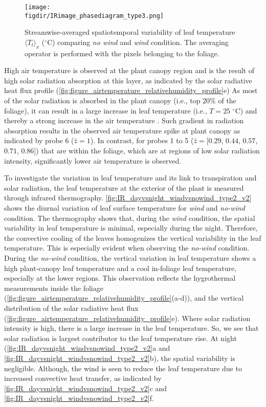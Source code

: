 \begin{sidewaysfigure}[p]
	\centering
	\texttt{[image: \\figdir/IRimage\_phasediagram\_type3.png]}
	\caption{Streamwise-averaged spatiotemporal variability of leaf temperature $\langle T_l \rangle_x$ ($^{\circ}$C) comparing  \textit{no wind} and  \textit{wind} condition. The averaging operator is performed with the pixels belonging to the foliage.}
	\label{fig:IRimage_phasediagram_type3}
\end{sidewaysfigure}

High air temperature is observed at the plant canopy region and is the result of high solar radiation absorption at this layer, as indicated by the solar radiative heat flux profile (\cref{fig:figure_airtemperature_relativehumidity_profile}e) As most of the solar radiation is absorbed in the plant canopy (i.e., top $20\%$ of the foliage), it can result in a large increase in leaf temperature (i.e., $T=25$ $^{\circ}$C) and thereby a strong increase in the air temperature \citep{Manickathan2018a}. Such gradient in radiation absorption results in the observed air temperature spike at plant canopy as indicated by probe 6 ($\hat{z}=1$). In contrast, for probes 1 to 5 ($\hat{z}=[0.29$, $0.44$, $0.57$, $0.71$, $0.86]$) that are within the foliage, which are at regions of low solar radiation intensity, significantly lower air temperature is observed.

To investigate the variation in leaf temperature and its link to transpiration and solar radiation, the leaf temperature at the exterior of the plant is measured through infrared thermography. \cref{fig:IR_dayvsnight_windvsnowind_type2_v2} shows the diurnal variation of leaf surface temperature for \textit{wind} and \textit{no-wind} condition. The thermography shows that, during the \textit{wind} condition, the spatial variability in leaf temperature is minimal, especially during the night. Therefore, the convective cooling of the leaves homogenizes the vertical variability in the leaf temperature. This is especially evident when observing the \textit{no-wind} condition. During the \textit{no-wind} condition, the vertical variation in leaf temperature shows a high plant-canopy leaf temperature and a cool in-foliage leaf temperature, especially at the lower regions. This observation reflects the hygrothermal measurements inside the foliage (\cref{fig:figure_airtemperature_relativehumidity_profile}(a-d)), and the vertical distribution of the solar radiative heat flux (\cref{fig:figure_airtemperature_relativehumidity_profile}e). Where solar radiation intensity is high, there is a large increase in the leaf temperature. So, we see that solar radiation is largest contributor to the leaf temperature rise. At night (\cref{fig:IR_dayvsnight_windvsnowind_type2_v2}a and \cref{fig:IR_dayvsnight_windvsnowind_type2_v2}b), the spatial variability is negligible. Although, the wind is seen to reduce the leaf temperature due to increased convective heat transfer, as indicated by \cref{fig:IR_dayvsnight_windvsnowind_type2_v2}c and \cref{fig:IR_dayvsnight_windvsnowind_type2_v2}f.

